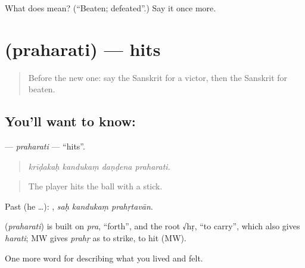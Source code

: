 \begin{tcolorbox}[breakable,colback=teal!4,colframe=teal!35!black,title={Before you move on}]
What does  mean? (\textquotedblleft{}Beaten; defeated\textquotedblright{}.) Say it once more.
\end{tcolorbox}
\section[\texorpdfstring{\sk{प्रहरति} (praharati)}{प्रहरति (praharati)}]{ (praharati) — hits}

\label{lesson:SA-C524-praharati}



\begin{quote}
Before the new one: say the Sanskrit for a victor, then the Sanskrit for beaten.
\end{quote}

\subsection*{You'll want to know: }
\textbf{} — \emph{praharati} — \textquotedblleft{}hits\textquotedblright{}.

\begin{quote}
   
\end{quote}

\begin{quote}
\emph{krīḍakaḥ kandukaṃ daṇḍena praharati.}
\end{quote}

\begin{quote}
The player hits the ball with a stick.
\end{quote}

Past (he …):   , \emph{saḥ kandukaṃ prahṛtavān}.

\begin{cousinweb}
\textbf{} (\emph{praharati}) is built on \emph{pra}, \textquotedblleft{}forth\textquotedblright{}, and the root √hṛ, \textquotedblleft{}to carry\textquotedblright{}, which also gives \emph{harati}; MW gives \emph{prahṛ} as to strike, to hit (MW).
\end{cousinweb}

\begin{grammarlens}[title={What you've built}]
One more word for describing what you lived and felt.
\end{grammarlens}

